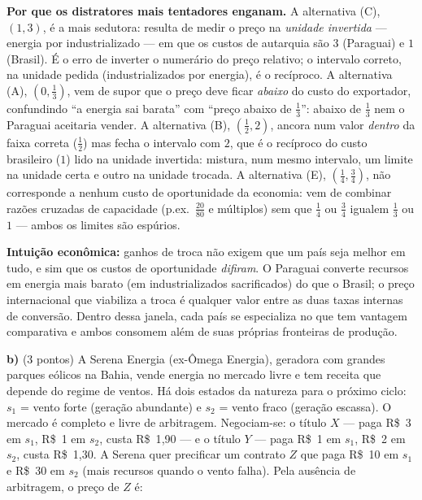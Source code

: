 \begin{solucao}
\textbf{Por que os distratores mais tentadores enganam.} A alternativa (C), $(1,3)$, é a mais sedutora: resulta de medir o preço na \emph{unidade invertida} --- energia por industrializado --- em que os custos de autarquia são $3$ (Paraguai) e $1$ (Brasil). É o erro de inverter o numerário do preço relativo; o intervalo correto, na unidade pedida (industrializados por energia), é o recíproco. A alternativa (A), $(0,\tfrac13)$, vem de supor que o preço deve ficar \emph{abaixo} do custo do exportador, confundindo ``a energia sai barata'' com ``preço abaixo de $\tfrac13$'': abaixo de $\tfrac13$ nem o Paraguai aceitaria vender. A alternativa (B), $(\tfrac12,2)$, ancora num valor \emph{dentro} da faixa correta ($\tfrac12$) mas fecha o intervalo com $2$, que é o recíproco do custo brasileiro ($1$) lido na unidade invertida: mistura, num mesmo intervalo, um limite na unidade certa e outro na unidade trocada. A alternativa (E), $(\tfrac14,\tfrac34)$, não corresponde a nenhum custo de oportunidade da economia: vem de combinar razões cruzadas de capacidade (p.ex.\ $\tfrac{20}{80}$ e múltiplos) sem que $\tfrac14$ ou $\tfrac34$ igualem $\tfrac13$ ou $1$ --- ambos os limites são espúrios.

\textbf{Intuição econômica:} ganhos de troca não exigem que um país seja melhor em tudo, e sim que os custos de oportunidade \emph{difiram}. O Paraguai converte recursos em energia mais barato (em industrializados sacrificados) do que o Brasil; o preço internacional que viabiliza a troca é qualquer valor entre as duas taxas internas de conversão. Dentro dessa janela, cada país se especializa no que tem vantagem comparativa e ambos consomem além de suas próprias fronteiras de produção.
\end{solucao}

\textbf{b)} (3 pontos) A Serena Energia (ex-Ômega Energia), geradora com grandes parques eólicos na Bahia, vende energia no mercado livre e tem receita que depende do regime de ventos. Há dois estados da natureza para o próximo ciclo: $s_1$ = vento forte (geração abundante) e $s_2$ = vento fraco (geração escassa). O mercado é completo e livre de arbitragem. Negociam-se: o título $X$ --- paga R\$~3 em $s_1$, R\$~1 em $s_2$, custa R\$~1{,}90 --- e o título $Y$ --- paga R\$~1 em $s_1$, R\$~2 em $s_2$, custa R\$~1{,}30. A Serena quer precificar um contrato $Z$ que paga R\$~10 em $s_1$ e R\$~30 em $s_2$ (mais recursos quando o vento falha). Pela ausência de arbitragem, o preço de $Z$ é:

